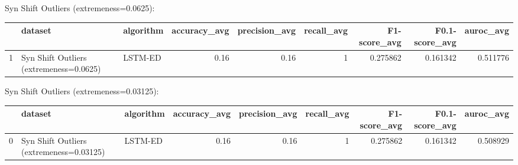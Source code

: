 Syn Shift Outliers (extremeness=0.0625):

\begin{tabular}{rllrrrrrr}
\hline
    & dataset                                 & algorithm   &   accuracy\_avg &   precision\_avg &   recall\_avg &   F1-score\_avg &   F0.1-score\_avg &   auroc\_avg \\
\hline
  1 & Syn Shift Outliers (extremeness=0.0625) & LSTM-ED     &           0.16 &            0.16 &            1 &       0.275862 &         0.161342 &    0.511776 \\
\hline
\end{tabular}

Syn Shift Outliers (extremeness=0.03125):

\begin{tabular}{rllrrrrrr}
\hline
    & dataset                                  & algorithm   &   accuracy\_avg &   precision\_avg &   recall\_avg &   F1-score\_avg &   F0.1-score\_avg &   auroc\_avg \\
\hline
  0 & Syn Shift Outliers (extremeness=0.03125) & LSTM-ED     &           0.16 &            0.16 &            1 &       0.275862 &         0.161342 &    0.508929 \\
\hline
\end{tabular}

